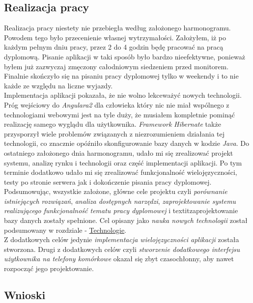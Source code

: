 \documentclass[10pt,titlepage]{article} %
\begin{document}
\subsection{Realizacja pracy}

Realizacja pracy niestety nie przebiegła według założonego harmonogramu. Powodem tego było przecenienie własnej wytrzymałości. Założyłem, iż po każdym pełnym dniu pracy, przez 2 do 4 godzin będę pracować na pracą dyplomową. Pisanie aplikacji w taki sposób było bardzo nieefektywne, ponieważ byłem już zazwyczaj zmęczony całodniowym siedzeniem przed monitorem. Finalnie skończyło się na pisaniu pracy dyplomowej tylko w weekendy i to nie każde ze względu na liczne wyjazdy.\mbox{}\\
Implementacja aplikacji pokazała, że nie wolno lekceważyć nowych technologii. Próg wejściowy do \textit{Angulara2} dla człowieka który nic nie miał wspólnego z technologiami webowymi jest na tyle duży, że musiałem kompletnie pominąć realizację samego wyglądu dla użytkownika. \textit{Framework} \textit{Hibernate} także przysporzył wiele problemów związanych z niezrozumieniem działania tej technologii, co znacznie opóźniło skonfigurowanie bazy danych w kodzie \textit{Java}. Do ostatniego założonego dnia harmonogramu, udało mi się zrealizować projekt systemu, analizę rynku i technologii oraz część implementacji aplikacji. Po tym terminie dodatkowo udało mi się zrealizować funkcjonalność wielojęzyczności, testy po stronie serwera jak i dokończenie pisania pracy dyplomowej.\mbox{}\\
Podsumowując, wszystkie założone, główne cele projektu czyli \textit{porównanie istniejących rozwiązań}, \textit{analiza dostępnych narzędzi}, \textit{zaprojektowanie systemu realizującego funkcjonalność tematu pracy dyplomowej} i textit{zaprojektowanie bazy danych} zostały spełnione. Cel opisany jako \textit{nauka nowych technologii} został podsumowany w rozdziale - \hyperref[Technologie]{Technologie}. \mbox{}\\
Z dodatkowych celów jedynie \textit{implementacja wielojęzyczności aplikacji} została stworzona. Drugi z dodatkowych celów czyli \textit{stworzenie dodatkowego interfejsu użytkownika na telefony komórkowe} okazał się zbyt czasochłonny, aby nawet rozpocząć jego projektowanie.

\subsection{Wnioski}
\end{document}
